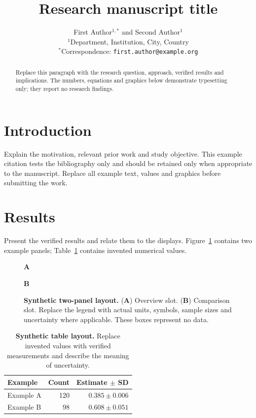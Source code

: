 \documentclass[12pt]{article}
\title{Research manuscript title}
\author{First Author$^{1,*}$ and Second Author$^{1}$\\
  \small $^{1}$Department, Institution, City, Country\\
  \small $^{*}$Correspondence: \texttt{first.author@example.org}}
\date{}
\begin{document}
\maketitle
\begin{abstract}
Replace this paragraph with the research question, approach, verified results
and implications. The numbers, equations and graphics below demonstrate
typesetting only; they report no research findings.
\end{abstract}

\section*{Introduction}
Explain the motivation, relevant prior work and study objective. This example
citation tests the bibliography only and should be retained only when
appropriate to the manuscript\cite{peng2011reproducible}. Replace all example
text, values and graphics before submitting the work.

\section*{Results}
Present the verified results and relate them to the displays.
Figure~\ref{fig:overview} contains two example panels; Table~\ref{tab:main}
contains invented numerical values.
\begin{figure}[htbp]
\centering
\begin{minipage}[t]{0.47\linewidth}
\centering\textbf{A}\par\smallskip
{}
\end{minipage}\hfill
\begin{minipage}[t]{0.47\linewidth}
\centering\textbf{B}\par\smallskip
{}
\end{minipage}
\caption{\textbf{Synthetic two-panel layout.} (\textbf{A}) Overview slot.
(\textbf{B}) Comparison slot. Replace the legend with actual units, symbols,
sample sizes and uncertainty where applicable. These boxes represent no data.}
\label{fig:overview}
\end{figure}

\begin{table}[htbp]
\centering
\caption{\textbf{Synthetic table layout.} Replace invented values with
verified measurements and describe the meaning of uncertainty.}
\label{tab:main}
\begin{tabular}{lrr}
\hline
Example & Count & Estimate $\pm$ SD\\
\hline
Example A & 120 & $0.385 \pm 0.006$\\
Example B & 98 & $0.608 \pm 0.051$\\
\hline
\end{tabular}
\end{table}
\end{document}
